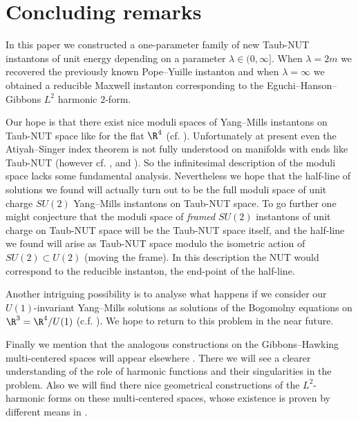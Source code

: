 \documentclass[a4paper,12pt,draft]{article}
\begin{document}
\section{Concluding remarks}

In this paper we constructed a one-parameter family of new Taub-NUT instantons
of unit energy
depending on a parameter $\lambda\in (0,\infty]$. When $\lambda=2m$ we
recovered the previously known Pope--Yuille instanton and when
$\lambda=\infty$ we obtained a reducible Maxwell instanton corresponding
to the Eguchi--Hanson--Gibbons $L^2$ harmonic $2$-form. 

Our hope is that there exist nice moduli spaces of Yang--Mills instantons
on Taub-NUT
space like for the flat $\R^4$ (cf. \cite{ati-hit-sin}). Unfortunately at
present even the Atiyah--Singer index theorem is not fully understood on
manifolds with ends like Taub-NUT (however cf. \cite{pop},
\cite{nye-sin} and \cite{vai}). So the infinitesimal description of the
moduli space lacks some 
fundamental analysis. Nevertheless we hope that the half-line of solutions we
found will actually turn out to be the full moduli space of unit
charge $SU(2)$ Yang--Mills instantons on
Taub-NUT space. To go further one might conjecture that the moduli space
of {\em framed} $SU(2)$ instantons of unit charge on Taub-NUT space will
be the Taub-NUT space itself, and the half-line we found will arise as
Taub-NUT space modulo the isometric action of $SU(2)\subset U(2)$ (moving
the frame). In this description the NUT would correspond to the reducible
instanton, the end-point of the half-line. 

Another intriguing possibility is to analyse what happens if we consider
our $U(1)$-invariant Yang--Mills solutions as solutions of the Bogomolny
equations on $\R^3=\R^4/U(1)$ (c.f. \cite{kro}). We hope to return to
this problem in the near future.

Finally we mention that the analogous constructions on the
Gibbons--Hawking multi-centered spaces will appear elsewhere
\cite{ete-hau3}. There we will see a clearer understanding of the role of
harmonic functions and their singularities in the problem. Also we will
find there nice geometrical constructions of the $L^2$-harmonic forms on
these multi-centered spaces, whose existence is proven by different
means in \cite{hau-maz}. 
\end{document}
